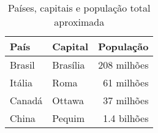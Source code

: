 \documentclass[serif]{uffstex}
\begin{document}
\begin{table}[h]
  \centering
  \caption{Países, capitais e população total aproximada}
  \begin{tabular}{@{}llr@{}}
    \toprule %
    País   & Capital & População\footnotemark\\
    \midrule %
    Brasil & Brasília & 208 milhões\\
    Itália & Roma     & 61 milhões\\
    Canadá & Ottawa   & 37 milhões\\
    China  & Pequim   & 1.4 bilhões\\
    \bottomrule %
  \end{tabular}
  \label{tab:paises}
\end{table}

\end{document}
